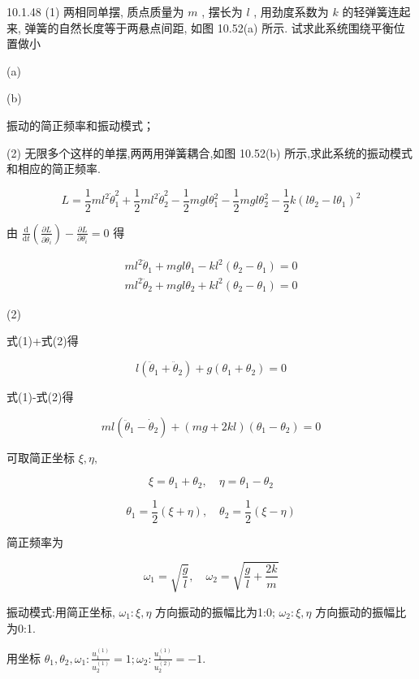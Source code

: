 \begin{problem}{10.1.48}
(1) 两相同单摆, 质点质量为 $m$ , 摆长为 $l$ , 用劲度系数为 $k$ 的轻弹簧连起来, 弹簧的自然长度等于两悬点间距, 如图 10.52(a) 所示. 试求此系统围绕平衡位置做小

(a)

(b)

振动的简正频率和振动模式；

(2) 无限多个这样的单摆,两两用弹簧耦合,如图 10.52(b) 所示,求此系统的振动模式和相应的简正频率.

\[
L = \frac {1}{2} m l ^ {2} \dot {\theta} _ {1} ^ {2} + \frac {1}{2} m l ^ {2} \dot {\theta} _ {2} ^ {2} - \frac {1}{2} m g l \theta_ {1} ^ {2} - \frac {1}{2} m g l \theta_ {2} ^ {2} - \frac {1}{2} k (l \theta_ {2} - l \theta_ {1}) ^ {2}
\]

由 $\frac{\mathrm{d}}{\mathrm{d}t}\left(\frac{\partial L}{\partial\dot{\theta}_i}\right) - \frac{\partial L}{\partial\theta_i} = 0$ 得

\[
\begin{array}{l} m l ^ {2} \ddot {\theta} _ {1} + m g l \theta_ {1} - k l ^ {2} (\theta_ {2} - \theta_ {1}) = 0 \\ m l ^ {2} \ddot {\theta} _ {2} + m g l \theta_ {2} + k l ^ {2} (\theta_ {2} - \theta_ {1}) = 0 \end{array}\tag{1}
\]

(2) 

式(1)+式(2)得

\[
l (\ddot {\theta} _ {1} + \ddot {\theta} _ {2}) + g (\theta_ {1} + \theta_ {2}) = 0
\]

式(1)-式(2)得

\[
m l \left(\ddot {\theta} _ {1} - \dot {\theta} _ {2}\right) + (m g + 2 k l) \left(\theta_ {1} - \theta_ {2}\right) = 0
\]

可取简正坐标 $\xi, \eta,$ 

\[
\xi = \theta_ {1} + \theta_ {2}, \quad \eta = \theta_ {1} - \theta_ {2}
\]

\[
\theta_ {1} = \frac {1}{2} (\xi + \eta), \quad \theta_ {2} = \frac {1}{2} (\xi - \eta)
\]

简正频率为

\[
\omega_ {1} = \sqrt {\frac {g}{l}}, \quad \omega_ {2} = \sqrt {\frac {g}{l} + \frac {2 k}{m}}
\]

振动模式:用简正坐标, $\omega_{1}:\xi,\eta$ 方向振动的振幅比为1:0; $\omega_{2}:\xi,\eta$ 方向振动的振幅比为0:1.

用坐标 $\theta_{1},\theta_{2},\omega_{1}:\frac{u_{1}^{(1)}}{u_{2}^{(1)}} = 1;\omega_{2}:\frac{u_{1}^{(1)}}{u_{2}^{(2)}} = -1.$ 


\end{problem}
